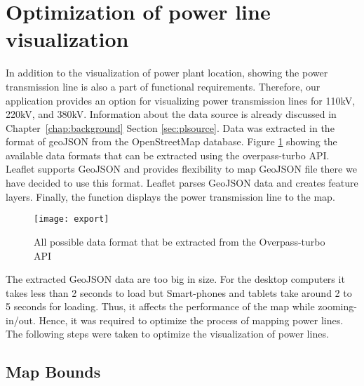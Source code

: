 \section{Optimization of power line visualization}
\label{sec:powerLine}

In addition to the visualization of power plant location, showing the power transmission line is also a part of functional requirements. Therefore, our application provides an option for visualizing power transmission lines for 110kV, 220kV, and 380kV. Information about the data source is already discussed in Chapter~\ref{chap:background} Section \ref{sec:plsource}. Data was extracted in the format of geoJSON from the OpenStreetMap database. Figure \ref{fig:export} showing the available data formats that can be extracted using the overpass-turbo API. Leaflet supports GeoJSON and provides flexibility to map GeoJSON file there we have decided to use this format. Leaflet parses GeoJSON data and creates feature layers. Finally, the function displays the power transmission line to the map.

\begin{figure}
\centering
\texttt{[image: export]}
\caption{All possible data format that be extracted from the Overpass-turbo API}
\label{fig:export}
\end{figure}

The extracted GeoJSON data are too big in size. For the desktop computers it takes less than 2 seconds to load but Smart-phones and tablets take around 2 to 5 seconds for loading. Thus, it affects the performance of the map while zooming-in/out. Hence, it was required to optimize the process of mapping power lines. The following steps were taken to optimize the visualization of power lines.

\subsection{Map Bounds}

